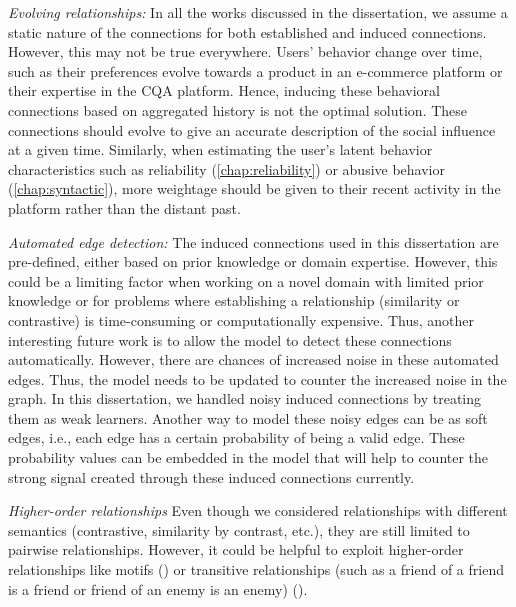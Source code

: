 \emph{Evolving relationships:}
In all the works discussed in the dissertation, we assume a static nature of the connections for both established and induced connections. However, this may not be true everywhere. Users' behavior change over time, such as their preferences evolve towards a product in an e-commerce platform or their expertise in the CQA platform. Hence, inducing these behavioral connections based on aggregated history is not the optimal solution. These connections should evolve to give an accurate description of the social influence at a given time. Similarly, when estimating the user's latent behavior characteristics such as reliability (\cref{chap:reliability}) or abusive behavior (\cref{chap:syntactic}), more weightage should be given to their recent activity in the platform rather than the distant past.


\emph{Automated edge detection:}
The induced connections used in this dissertation are pre-defined, either based on prior knowledge or domain expertise. However, this could be a limiting factor when working on a novel domain with limited prior knowledge or for problems where establishing a relationship (similarity or contrastive) is time-consuming or computationally expensive. Thus, another interesting future work is to allow the model to detect these connections automatically.
However, there are chances of increased noise in these automated edges. Thus, the model needs to be updated to counter the increased noise in the graph.
In this dissertation, we handled noisy induced connections by treating them as weak learners. Another way to model these noisy edges can be as soft edges, i.e., each edge has a certain probability of being a valid edge. These probability values can be embedded in the model that will help to counter the strong signal created through these induced connections currently.


\emph{Higher-order relationships}
Even though we considered relationships with different semantics (contrastive, similarity by contrast, etc.), they are still limited to pairwise relationships. However, it could be helpful to exploit higher-order relationships like motifs (\cite{motifnet, motifbased}) or transitive relationships (such as a friend of a friend is a friend or friend of an enemy is an enemy) (\cite{signedgcn}).
